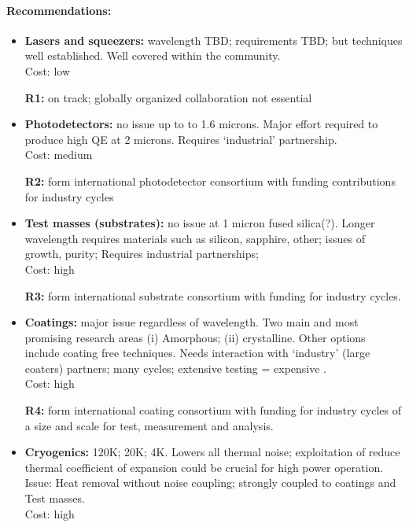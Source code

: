 \paragraph{Recommendations:}

\begin{itemize}

\item \noindent \textbf{Lasers and squeezers:}  wavelength TBD; requirements TBD; but techniques well established. 
 Well covered within the community.\\    Cost:  low

\textbf{R1:}  on track; globally organized collaboration not essential

\item \noindent \textbf{Photodetectors:}  no issue up to to 1.6 microns.  Major effort required to produce high QE at 2 microns.  Requires `industrial' partnership. \\ Cost:  medium

\textbf{R2:}  form international photodetector consortium with funding contributions for industry cycles

\item \noindent \textbf{Test masses (substrates): } no issue at 1 micron fused silica(?).  Longer wavelength requires materials such as silicon, sapphire, other;  issues of growth, purity;  Requires industrial partnerships; \\ 
Cost:  high

\textbf{R3:}  form international substrate consortium with funding for industry cycles.

\item \noindent \textbf{Coatings: }major issue regardless of wavelength.  Two main and most promising research areas (i) Amorphous; (ii) crystalline.  Other options include coating free techniques.  Needs interaction with `industry' (large coaters) partners; many cycles; extensive testing = expensive .\\   
Cost:  high

\textbf{R4:}  form international coating consortium with funding for industry cycles of a size and scale for test, measurement and analysis.

\item \noindent \textbf{Cryogenics:}  120K; 20K; 4K.  Lowers all thermal noise; exploitation of reduce thermal coefficient of expansion could be crucial for high power operation.  Issue: Heat removal without noise coupling; strongly coupled to coatings and Test masses.\\     
Cost: high


\end{itemize}
